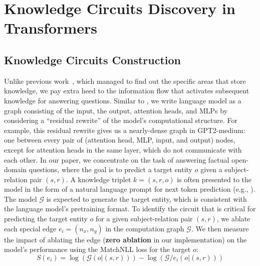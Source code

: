 \section{Knowledge Circuits Discovery in Transformers}
\subsection{Knowledge Circuits Construction}
Unlike previous work~\cite{dai-etal-2022-knowledge,meng2022locating}, which managed to find out the specific areas that store knowledge, we pay extra heed to the information flow that activates subsequent knowledge for answering questions.
Similar to \cite{goldowsky2023localizing, wang2023interpretability}, we write language model as a graph consisting of the input, the output, attention heads, and MLPs by considering a ``residual rewrite'' of the model's computational structure.
For example, this residual rewrite gives us a nearly-dense graph in GPT2-medium: one between every pair of (attention head, MLP, input, and output) nodes, except for attention heads in the same layer, which do not communicate with each other.
In our paper, we concentrate on the task of answering factual open-domain questions, where the goal is to predict a target entity $o$ given a subject-relation pair $(s, r)$.
A knowledge triplet $k=(s, r, o)$ is often presented to the model in the form of a natural language prompt for next token prediction (e.g.,  ). 
The model $\mathcal{G}$ is expected to generate the target entity, which is consistent with the language model's pretraining format.
To identify the circuit that is critical for predicting the target entity $o$ for a given subject-relation pair $(s, r)$, we ablate each special edge $e_{i} = (n_{x},n_{y})$ in the computation graph $\mathcal{G}$. 
We then measure the impact of ablating the edge (\textbf{zero ablation} in our implementation) on the model's performance using the MatchNLL loss \cite{acdc} for the target $o$:
\begin{equation}
    S(e_{i}) =  \log(\mathcal{G}(o|(s,r)))- \log(\mathcal{G}/e_{i}(o|(s,r)))
    \label{metric_S}
\end{equation}
